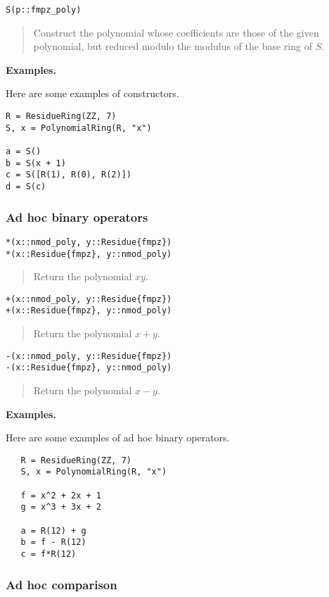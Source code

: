\documentclass[a4paper,10pt]{article}
\newcommand{\desc}[1]{\vspace{-3mm}\begin{quote}#1\end{quote}}
\begin{document}
{{\begin{lstlisting}
S(p::fmpz_poly)
\end{lstlisting}

\desc{Construct the polynomial whose coefficients are those of the given polynomial, but
reduced modulo the modulus of the base ring of $S$.}

\textbf{Examples.}

Here are some examples of constructors.

\begin{lstlisting}
R = ResidueRing(ZZ, 7)
S, x = PolynomialRing(R, "x")

a = S()
b = S(x + 1)
c = S([R(1), R(0), R(2)])
d = S(c)
\end{lstlisting}

\subsubsection{Ad hoc binary operators}

\begin{lstlisting}
*(x::nmod_poly, y::Residue{fmpz})
*(x::Residue{fmpz}, y::nmod_poly)
\end{lstlisting}

\desc{Return the polynomial $xy$.}

\begin{lstlisting}
+(x::nmod_poly, y::Residue{fmpz})
+(x::Residue{fmpz}, y::nmod_poly)
\end{lstlisting}

\desc{Return the polynomial $x + y$.}

\begin{lstlisting}
-(x::nmod_poly, y::Residue{fmpz})
-(x::Residue{fmpz}, y::nmod_poly)
\end{lstlisting}

\desc{Return the polynomial $x - y$.}

\textbf{Examples.}

Here are some examples of ad hoc binary operators.

\begin{lstlisting}
   R = ResidueRing(ZZ, 7)
   S, x = PolynomialRing(R, "x")

   f = x^2 + 2x + 1
   g = x^3 + 3x + 2

   a = R(12) + g
   b = f - R(12)
   c = f*R(12)
\end{lstlisting}

\subsubsection{Ad hoc comparison}

}}
\end{document}
